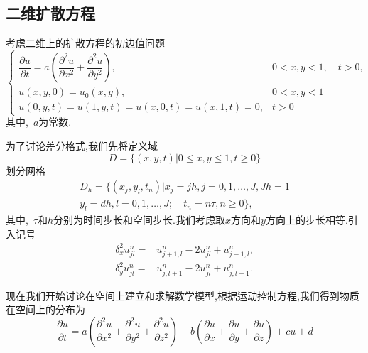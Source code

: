 \subsection{二维扩散方程}
考虑二维上的扩散方程的初边值问题
\begin{equation}
\begin{cases}
\dfrac{\partial u}{\partial t}=a\left(\dfrac{\partial^2 u}{\partial x^2}+\dfrac{\partial^2 u}{\partial y^2}\right),& 0<x,y<1,\quad t>0, \\
u(x,y,0)=u_0(x,y),& 0<x,y<1 \\
u(0,y,t)=u(1,y,t)=u(x,0,t)=u(x,1,t)=0,& t>0
\end{cases}
\end{equation}
其中,~$a$为常数.\par
为了讨论差分格式,我们先将定义域
\begin{equation*}
D=\{(x,y,t)|0\leq x,y\leq 1,t\geq 0\}
\end{equation*}
划分网格
\begin{equation}
\begin{split}
D_h=\{(x_j,y_l,t_n)|x_j=jh,j=0,1,\ldots,J,Jh=1 \\
y_l=dh,l=0,1,\ldots,J;\quad t_n=n\tau,n\geq0\},
\nonumber
\end{split}
\end{equation}
其中,~$\tau$和$h$分别为时间步长和空间步长.我们考虑取$x$方向和$y$方向上的步长相等.引入记号
\begin{equation*}
\begin{split}
\delta_x^2 u_{jl}^n =& u_{j+1,l}^n-2u_{jl}^n+u_{j-1,l}^n, \\
\delta_y^2 u_{jl}^n =& u_{j,l+1}^n-2u_{jl}^n+u_{j,l-1}^n.
\end{split}
\end{equation*}



现在我们开始讨论在空间上建立和求解数学模型,根据运动控制方程,我们得到物质在空间上的分布为
\begin{equation}
 \dfrac{\partial u}{\partial t}=a\left(\dfrac{\partial^2 u}{\partial x^2}+\dfrac{\partial^2 u}{\partial y^2}
 +\dfrac{\partial^2 u}{\partial z^2}\right)-b\left(\dfrac{\partial u}{\partial x}+\dfrac{\partial u}{\partial y}
 +\dfrac{\partial u}{\partial z}\right)+cu+d
\end{equation}
